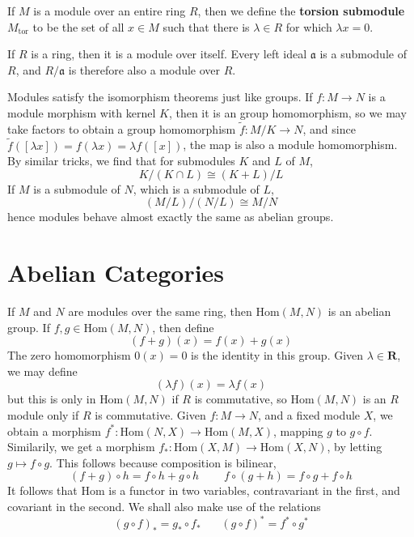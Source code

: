 \begin{example}
    If $M$ is a module over an entire ring $R$, then we define the {\bf torsion submodule} $M_{\text{tor}}$ to be the set of all $x \in M$ such that there is $\lambda \in R$ for which $\lambda x = 0$.
\end{example}

\begin{example}
    If $R$ is a ring, then it is a module over itself. Every left ideal $\mathfrak{a}$ is a submodule of $R$, and $R/\mathfrak{a}$ is therefore also a module over $R$.
\end{example}

Modules satisfy the isomorphism theorems just like groups. If $f:M \to N$ is a module morphism with kernel $K$, then it is an group homomorphism, so we may take factors to obtain a group homomorphism $\tilde{f}: M/K \to N$, and since $\tilde{f}([\lambda x]) = f(\lambda x) = \lambda f([x])$, the map is also a module homomorphism. By similar tricks, we find that for submodules $K$ and $L$ of $M$,
%
\[ K/(K \cap L) \cong (K + L)/L \]
%
If $M$ is a submodule of $N$, which is a submodule of $L$,
%
\[ (M/L)/(N/L) \cong M/N \]
%
hence modules behave almost exactly the same as abelian groups.

\section{Abelian Categories}

If $M$ and $N$ are modules over the same ring, then $\text{Hom}(M,N)$ is an abelian group. If $f,g \in \text{Hom}(M,N)$, then define
%
\[ (f + g)(x) = f(x) + g(x) \]
%
The zero homomorphism $0(x) = 0$ is the identity in this group. Given $\lambda \in \mathbf{R}$, we may define
%
\[ (\lambda f)(x) = \lambda f(x) \]
%
but this is only in $\text{Hom}(M,N)$ if $R$ is commutative, so $\text{Hom}(M,N)$ is an $R$ module only if $R$ is commutative. Given $f: M \to N$, and a fixed module $X$, we obtain a morphism $f^*: \text{Hom}(N,X) \to \text{Hom}(M,X)$, mapping $g$ to $g \circ f$. Similarily, we get a morphism $f_*: \text{Hom}(X,M) \to \text{Hom}(X,N)$, by letting $g \mapsto f \circ g$. This follows because composition is bilinear,
%
\[ (f + g) \circ h = f \circ h + g \circ h\ \ \ \ \ \ \ \ \ \ f \circ (g + h) = f \circ g + f \circ h \]
It follows that $\text{Hom}$ is a functor in two variables, contravariant in the first, and covariant in the second. We shall also make use of the relations
%
\[ (g \circ f)_* = g_* \circ f_*\ \ \ \ \ \ \ \ (g \circ f)^* = f^* \circ g^* \]

